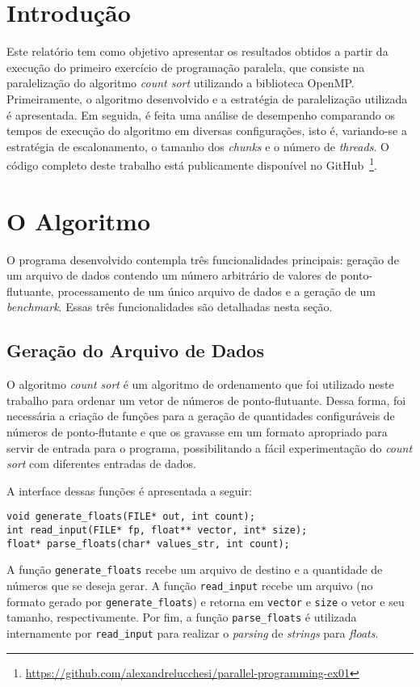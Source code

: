 \documentclass[12pt,a4paper]{article}
\begin{document}


\section{Introdução}
Este relatório tem como objetivo apresentar os resultados obtidos a partir da
execução do primeiro exercício de programação paralela, que consiste na
paralelização do algoritmo \emph{count sort} utilizando a biblioteca OpenMP\@.
Primeiramente, o algoritmo desenvolvido e a estratégia de paralelização
utilizada é apresentada. Em seguida, é feita uma análise de desempenho
comparando os tempos de execução do algoritmo em diversas configurações, isto é,
variando-se a estratégia de escalonamento, o tamanho dos \textit{chunks} e o
número de \textit{threads}. O código completo deste trabalho está publicamente
disponível no
GitHub~\footnote{\url{https://github.com/alexandrelucchesi/parallel-programming-ex01}}.

\section{O Algoritmo}
O programa desenvolvido contempla três funcionalidades principais: geração de um
arquivo de dados contendo um número arbitrário de valores de ponto-flutuante,
processamento de um único arquivo de dados e a geração de um \textit{benchmark}.
Essas três funcionalidades são detalhadas nesta seção.

\subsection{Geração do Arquivo de Dados}
O algoritmo \textit{count sort} é um algoritmo de ordenamento que foi utilizado
neste trabalho para ordenar um vetor de números de ponto-flutuante. Dessa forma,
foi necessária a criação de funções para a geração de quantidades configuráveis
de números de ponto-flutante e que os gravasse em um formato apropriado para
servir de entrada para o programa, possibilitando a fácil experimentação do
\textit{count sort} com diferentes entradas de dados.

A interface dessas funções é apresentada a seguir:

\begin{verbatim}
void generate_floats(FILE* out, int count);
int read_input(FILE* fp, float** vector, int* size);
float* parse_floats(char* values_str, int count);
\end{verbatim}

A função \texttt{generate\_floats} recebe um arquivo de destino e a quantidade de
números que se deseja gerar. A função \texttt{read\_input} recebe um arquivo (no
formato gerado por \texttt{generate\_floats}) e retorna em \texttt{vector} e
\texttt{size} o vetor e seu tamanho, respectivamente. Por fim, a função
\texttt{parse\_floats} é utilizada internamente por \texttt{read\_input} para
realizar o \textit{parsing} de \textit{strings} para \textit{floats}.
\end{document}
